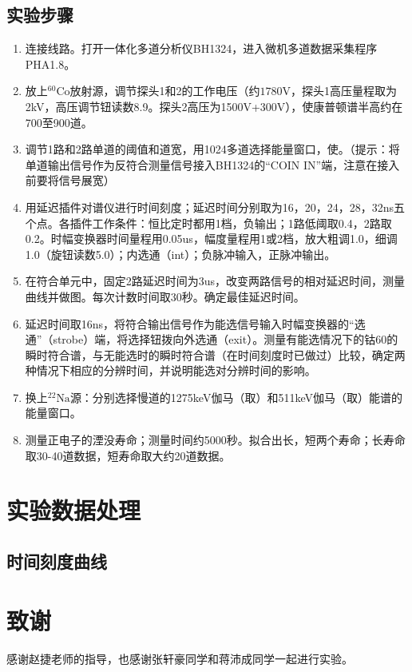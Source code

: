 \documentclass{article}
\begin{document}
\subsection{实验步骤}
\begin{enumerate}
    \item 连接线路。打开一体化多道分析仪BH1324，进入微机多道数据采集程序PHA1.8。
    \item 放上$^{60}\text{Co}$放射源，调节探头1和2的工作电压（约$\si{1780\V}$，探头1高压量程取为2kV，高压调节钮读数8.9。探头2高压为1500V+300V），使康普顿谱半高约在700至900道。
    \item 调节1路和2路单道的阈值和道宽，用1024多道选择能量窗口，使。（提示：将单道输出信号作为反符合测量信号接入BH1324的“COIN IN”端，注意在接入前要将信号展宽）
    \item 用延迟插件对谱仪进行时间刻度；延迟时间分别取为16，20，24，28，32ns五个点。各插件工作条件：恒比定时都用1档，负输出；1路低阈取0.4，2路取0.2。时幅变换器时间量程用0.05us，幅度量程用1或2档，放大粗调1.0，细调1.0（旋钮读数5.0）；内选通（int）；负脉冲输入，正脉冲输出。
    \item 在符合单元中，固定2路延迟时间为3us，改变两路信号的相对延迟时间，测量曲线并做图。每次计数时间取30秒。确定最佳延迟时间。
    \item 延迟时间取16ns，将符合输出信号作为能选信号输入时幅变换器的“选通”（strobe）端，将选择钮拨向外选通（exit）。测量有能选情况下的钴60的瞬时符合谱，与无能选时的瞬时符合谱（在时间刻度时已做过）比较，确定两种情况下相应的分辨时间，并说明能选对分辨时间的影响。
    \item 换上$^{22}\text{Na}$源：分别选择慢道的1275keV伽马（取）和511keV伽马（取）能谱的能量窗口。
    \item 测量正电子的湮没寿命；测量时间约5000秒。拟合出长，短两个寿命；长寿命取30-40道数据，短寿命取大约20道数据。
\end{enumerate}
\section{实验数据处理}
\subsection{时间刻度曲线}
\section{致谢}
    感谢赵捷老师的指导，也感谢张轩豪同学和蒋沛成同学一起进行实验。 
    \clearpage
    \appendix
    \appendixpage
\end{document}
